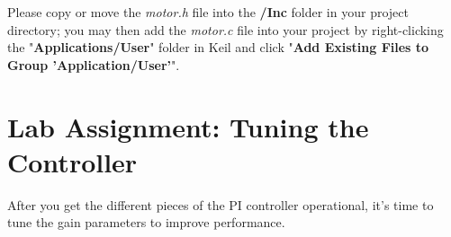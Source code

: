 \documentclass[openany,11pt,fleqn]{book} %
\begin{document}
Please copy or move the \textit{motor.h} file into the \textbf{/Inc} folder in your project directory; you may then add the \textit{motor.c} file into your project by right-clicking the "\textbf{Applications/User}" folder in Keil and click "\textbf{Add Existing Files to Group 'Application/User'}".


\section{\color{blue}Lab Assignment: Tuning the Controller}

After you get the different pieces of the PI controller operational, it's time to tune the gain parameters to improve performance.
\end{document}
